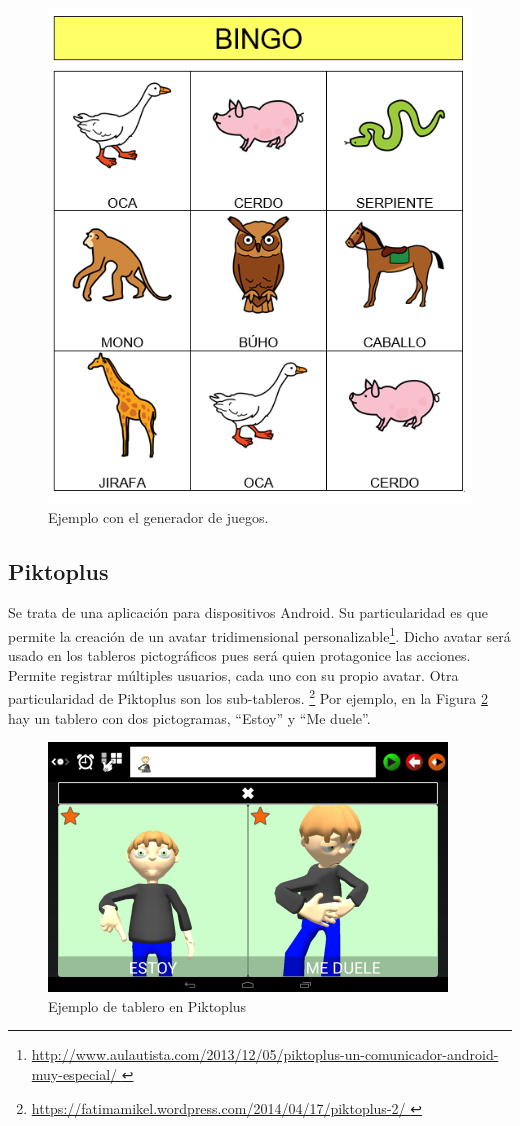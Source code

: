 \begin{itemize}
\begin{figure}[h!]
	\centering
	\includegraphics[width=0.7\linewidth]{Imagenes/Bitmap/juegoARASAAC}
	\caption{Ejemplo con el generador de juegos.}
	\label{fig:juegoarasaac}
\end{figure}



\end{itemize}



\newpage
\subsection{Piktoplus}
Se trata de una aplicación para dispositivos Android. Su particularidad es que permite la creación de un avatar tridimensional personalizable\footnote{\url{http://www.aulautista.com/2013/12/05/piktoplus-un-comunicador-android-muy-especial/ }}. Dicho avatar será usado en los tableros pictográficos pues será quien protagonice las acciones. Permite registrar múltiples usuarios, cada uno con su propio avatar. Otra particularidad de Piktoplus son los sub-tableros. \footnote{\url{https://fatimamikel.wordpress.com/2014/04/17/piktoplus-2/ }}  Por ejemplo, en la Figura \ref{fig:piktoplus1}  hay un tablero con dos pictogramas, “Estoy” y “Me duele”.


\begin{figure}[h!]
	\centering
	\includegraphics[width=0.5\linewidth]{Imagenes/Bitmap/Piktoplus1}
	\caption[Pictoplus tablero]{Ejemplo de tablero en Piktoplus}
	\label{fig:piktoplus1}
\end{figure}

